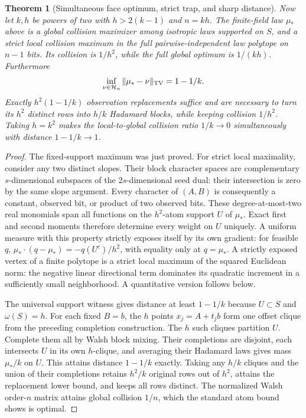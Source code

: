 \documentclass[11pt]{article}
\newtheorem{theorem}{Theorem}[section]
\begin{document}
\begin{theorem}[Simultaneous face optimum, strict trap, and sharp distance]
\label{thm:design-concentrated-trap}
Now let $k,h$ be powers of two with $h>2(k-1)$ and $n=kh$.
The finite-field law $\mu_*$ above is a global collision maximizer among
isotropic laws supported on $S$, and a strict local collision maximum
in the \emph{full} pairwise-independent law polytope on $n-1$ bits.
Its collision is $1/h^2$, while the full global optimum is $1/(kh)$.
Furthermore
\[
 \inf_{\nu\in\mathcal H_n}\|\mu_*-\nu\|_{\rm TV}=1-1/k.
\]
Exactly $h^2(1-1/k)$ observation replacements suffice and are necessary
to turn its $h^2$ distinct rows into $h/k$ Hadamard blocks, while keeping
collision $1/h^2$. Taking $h=k^2$ makes the local-to-global collision
ratio $1/k\to0$ simultaneously with distance $1-1/k\to1$.
\end{theorem}
\begin{proof}
The fixed-support maximum was just proved. For strict local maximality,
consider any two distinct slopes. Their block character spaces are
complementary $s$-dimensional subspaces of the $2s$-dimensional seed
dual: their intersection is zero by the same slope argument. Every
character of $(A,B)$ is consequently a constant, observed bit, or product
of two observed bits. These degree-at-most-two real monomials span all
functions on the $h^2$-atom support $U$ of $\mu_*$. Exact first and second
moments therefore determine every weight on $U$ uniquely.
A uniform measure with this property strictly exposes itself by its
own gradient: for feasible $q$,
$\mu_*\cdot(q-\mu_*)=-q(U^c)/h^2$, with equality only at $q=\mu_*$.
A strictly exposed vertex of a finite polytope is a strict local maximum
of the squared Euclidean norm: the negative linear directional term
dominates its quadratic increment in a sufficiently small neighborhood.
A quantitative version follows below.

The universal support witness gives distance at least $1-1/k$ because
$U\subset S$ and $\omega(S)=h$. For each fixed $B=b$, the $h$ points
$x_j=A+t_jb$ form one offset clique from the preceding completion
construction. The $h$ such cliques partition $U$. Complete them all by
Walsh block mixing. Their completions are disjoint, each intersects $U$
in its own $h$-clique, and averaging their Hadamard laws gives mass
$\mu_*/k$ on $U$. This attains distance $1-1/k$ exactly. Taking any
$h/k$ cliques and the union of their completions retains $h^2/k$ original
rows out of $h^2$, attains the replacement lower bound, and keeps all
rows distinct. The normalized Walsh order-$n$ matrix attains global
collision $1/n$, which the standard atom bound shows is optimal.
\end{proof}
\end{document}
